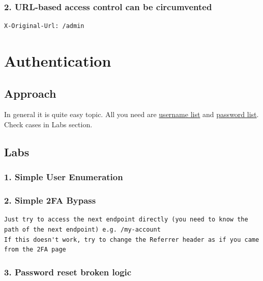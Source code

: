 \documentclass[
  letterpaper,
]{article}
\begin{document}
\subsubsection{2. URL-based access control can be
circumvented}\label{2-url-based-access-control-can-be-circumvented}

\begin{Verbatim}[breaklines,breakanywhere,fontsize=\small]
X-Original-Url: /admin
\end{Verbatim}

\section{Authentication}\label{authentication}

\subsection{Approach}\label{approach-13}

In general it is quite easy topic. All you need are
\href{https://portswigger.net/web-security/authentication/auth-lab-usernames}{username
list} and
\href{https://portswigger.net/web-security/authentication/auth-lab-passwords}{password
list}. Check cases in Labs section.

\subsection{Labs}\label{labs-12}

\subsubsection{1. Simple User
Enumeration}\label{1-simple-user-enumeration}

\subsubsection{2. Simple 2FA Bypass}\label{2-simple-2fa-bypass}

\begin{Verbatim}[breaklines,breakanywhere,fontsize=\small]
Just try to access the next endpoint directly (you need to know the path of the next endpoint) e.g. /my-account
If this doesn't work, try to change the Referrer header as if you came from the 2FA page 
\end{Verbatim}

\subsubsection{3. Password reset broken
logic}\label{3-password-reset-broken-logic}
\end{document}
